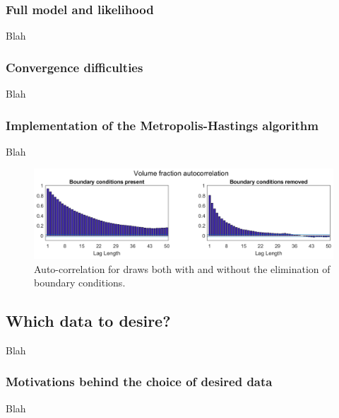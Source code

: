 \documentclass{article}
\begin{document}
\subsubsection{Full model and likelihood}
Blah

\subsubsection{Convergence difficulties}
Blah

\subsubsection{Implementation of the Metropolis-Hastings algorithm}
Blah

\begin{figure}
\centering
\includegraphics[width=.9\linewidth]{ACF_bnd_cnds_fig}
\caption{Auto-correlation for draws both with and without the elimination of boundary conditions.}
\end{figure}

\subsection{Which data to desire?}
Blah

\subsubsection{Motivations behind the choice of desired data}
Blah
\end{document}
